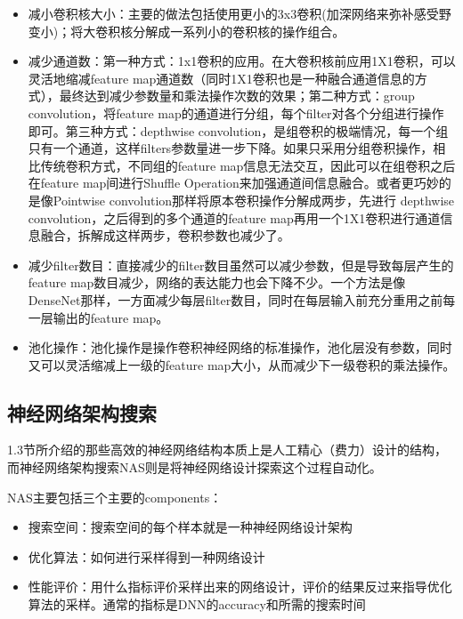 \documentclass[12pt]{article}
\begin{document}
\begin{itemize}
\setlength{\itemsep}{0pt}
\setlength{\parsep}{0pt}
\setlength{\parskip}{0pt}
    \item 减小卷积核大小：主要的做法包括使用更小的3x3卷积(加深网络来弥补感受野变小)；将大卷积核分解成一系列小的卷积核的操作组合。
    
    \item 减少通道数：第一种方式：1x1卷积的应用。在大卷积核前应用1X1卷积，可以灵活地缩减feature map通道数（同时1X1卷积也是一种融合通道信息的方式），最终达到减少参数量和乘法操作次数的效果；第二种方式：group convolution，将feature map的通道进行分组，每个filter对各个分组进行操作即可。第三种方式：depthwise convolution，是组卷积的极端情况，每一个组只有一个通道，这样filters参数量进一步下降。如果只采用分组卷积操作，相比传统卷积方式，不同组的feature map信息无法交互，因此可以在组卷积之后在feature map间进行Shuffle Operation来加强通道间信息融合。或者更巧妙的是像Pointwise convolution那样将原本卷积操作分解成两步，先进行 depthwise convolution，之后得到的多个通道的feature map再用一个1X1卷积进行通道信息融合，拆解成这样两步，卷积参数也减少了。
    \item 减少filter数目：直接减少的filter数目虽然可以减少参数，但是导致每层产生的feature map数目减少，网络的表达能力也会下降不少。一个方法是像DenseNet那样，一方面减少每层filter数目，同时在每层输入前充分重用之前每一层输出的feature map。

    \item 池化操作：池化操作是操作卷积神经网络的标准操作，池化层没有参数，同时又可以灵活缩减上一级的feature map大小，从而减少下一级卷积的乘法操作。
\end{itemize}

\subsection{神经网络架构搜索}
1.3节所介绍的那些高效的神经网络结构本质上是人工精心（费力）设计的结构，而神经网络架构搜索NAS则是将神经网络设计探索这个过程自动化。

NAS主要包括三个主要的components：
\begin{itemize}
\setlength{\itemsep}{0pt}
\setlength{\parsep}{0pt}
\setlength{\parskip}{0pt}
    \item 搜索空间：搜索空间的每个样本就是一种神经网络设计架构
    \item 优化算法：如何进行采样得到一种网络设计
    \item 性能评价：用什么指标评价采样出来的网络设计，评价的结果反过来指导优化算法的采样。通常的指标是DNN的accuracy和所需的搜索时间
\end{itemize}
\end{document}

